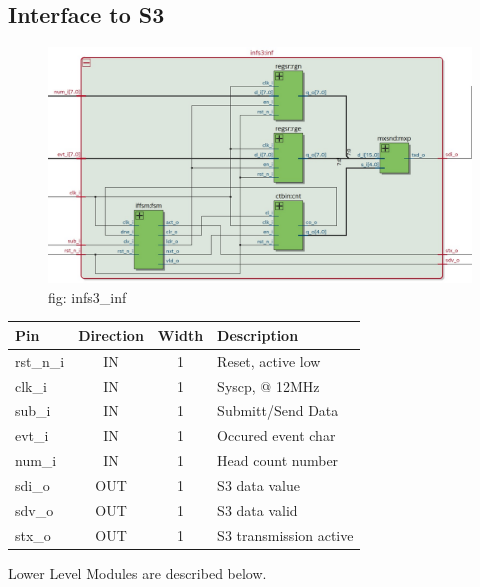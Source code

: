 \documentclass[12pt,a4 paper] {report}
\begin{document}
\subsection{Interface to S3}
\begin{figure}[h]
	\centering	
	\includegraphics[scale=0.3]{../png/infs3_inf.png}
	\newline
	fig: infs3\_inf\\
\end{figure}
\begin{center}
	\begin{tabular}{ | p{2cm} | c | c | p{5cm} |}
		\hline
		\textbf{Pin} & \textbf{Direction} & \textbf{Width} & \textbf{Description} \\
		\hline	
  	rst\_n\_i & IN & 1 & Reset, active low \\
  	\hline
		clk\_i & IN & 1 & Syscp, @ 12MHz \\
		\hline
		sub\_i & IN & 1 & Submitt/Send Data \\
		\hline
		evt\_i & IN & 1 &  Occured event char \\
		\hline
		num\_i & IN & 1 & Head count number \\
		\hline
		sdi\_o & OUT & 1 & S3 data value \\
		\hline
		sdv\_o & OUT & 1 & S3 data valid \\
		\hline
		stx\_o & OUT & 1 & S3 transmission active\\
		\hline
	\end{tabular}
\end{center}

\newpage

Lower Level Modules are described below.\\
\end{document}
